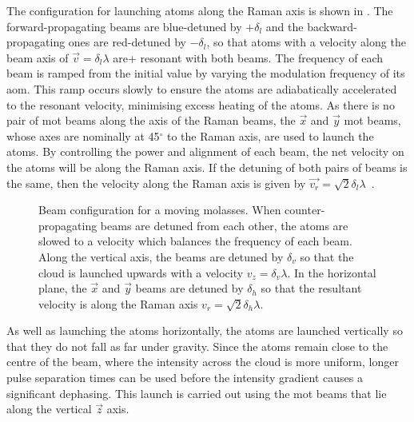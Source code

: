 The configuration for launching atoms along the Raman axis is shown in . The forward-propagating beams are blue-detuned by \(+\delta_l\) and the backward-propagating ones are red-detuned by \(-\delta_l\), so that atoms with a velocity along the beam axis of \(\vec{v} = \delta_l \lambda\) are+ resonant with both beams. The frequency of each beam is ramped from the initial value by varying the modulation frequency of its \ac{aom}. This ramp occurs slowly to ensure the atoms are adiabatically accelerated to the resonant velocity, minimising excess heating of the atoms. As there is no pair of \ac{mot} beams along the axis of the Raman beams, the \(\vec{x}\) and \(\vec{y}\) \ac{mot} beams, whose axes are nominally at 45\(^{\circ}\) to the Raman axis, are used to launch the atoms. By controlling the power and alignment of each beam, the net velocity on the atoms will be along the Raman axis. If the detuning of both pairs of beams is the same, then the velocity along the Raman axis is given by \(\vec{v_r} = \sqrt{2} \delta_l \lambda\)~\nocite{Ohshima1995}.
\begin{figure}[!htbp]
    \centering
    \def\svgwidth{0.6\textwidth}
    \caption[Beam configuration for a moving molasses]{Beam configuration for a moving molasses. When counter-propagating beams are detuned from each other, the atoms are slowed to a velocity which balances the frequency of each beam. Along the vertical axis, the beams are detuned by \(\delta_v\) so that the cloud is launched upwards with a velocity \(v_z = \delta_v \lambda\). In the horizontal plane, the \(\vec{x}\) and \(\vec{y}\) beams are detuned by \(\delta_h\) so that the resultant velocity is along the Raman axis \(v_r = \sqrt{2}\delta_h\lambda\). }
    \label{fig:moving_molasses}
\end{figure}
\par\noindent
As well as launching the atoms horizontally, the atoms are launched
vertically so that they do not fall as far under gravity. Since the
atoms remain close to the centre of the beam, where the intensity
across the cloud is more uniform, longer pulse separation times can be
used before the intensity gradient causes a significant dephasing.
This launch is carried out using the \ac{mot} beams that lie along the
vertical \(\vec{z}\) axis. 
\par\noindent
